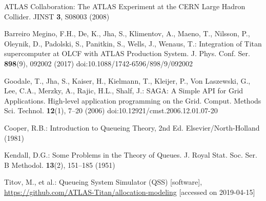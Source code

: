 ATLAS Collaboration: The ATLAS Experiment at the CERN Large Hadron Collider. JINST \textbf{3}, S08003 (2008)

Barreiro Megino, F.H., De, K., Jha, S., Klimentov, A., Maeno, T., Nilsson, P., Oleynik, D., Padolski, S., Panitkin, S., Wells, J., Wenaus, T.: Integration of Titan supercomputer at OLCF with ATLAS Production System. J. Phys. Conf. Ser. \textbf{898}(9), 092002 (2017) doi:10.1088/1742-6596/898/9/092002

Goodale, T., Jha, S., Kaiser, H., Kielmann, T., Kleijer, P., Von Laszewski, G., Lee, C.A., Merzky, A., Rajic, H.L., Shalf, J.: SAGA: A Simple API for Grid Applications. High-level application programming on the Grid. Comput. Methods Sci. Technol. \textbf{12}(1), 7--20 (2006) doi:10.12921/cmst.2006.12.01.07-20

Cooper, R.B.: Introduction to Queueing Theory, 2nd Ed. Elsevier/North-Holland (1981)

Kendall, D.G.: Some Problems in the Theory of Queues. J. Royal Stat. Soc. Ser. B Methodol. \textbf{13}(2), 151--185 (1951)

Titov, M., et al.: Queueing System Simulator (QSS) [software], \url{https://github.com/ATLAS-Titan/allocation-modeling} [accessed on 2019-04-15]

